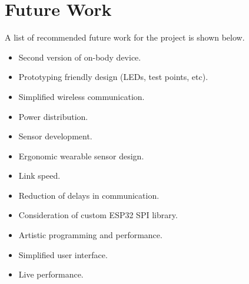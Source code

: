 \chapter{Future Work}
A list of recommended future work for the project is shown below.

\begin{itemize}
        \item Second version of on-body device.
        \item Prototyping friendly design (LEDs, test points, etc).
        \item Simplified wireless communication.
        \item Power distribution.
        \item Sensor development.
        \item Ergonomic wearable sensor design.
        \item Link speed.
        \item Reduction of delays in communication.
        \item Consideration of custom ESP32 SPI library.
        \item Artistic programming and performance.
        \item Simplified user interface.
        \item Live performance.
\end{itemize}
